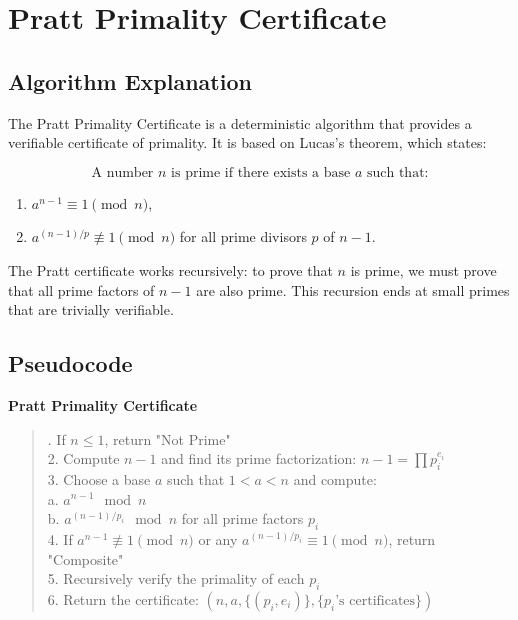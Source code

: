 \documentclass[12pt]{article}
\begin{document}
\section{Pratt Primality Certificate}

\subsection*{Algorithm Explanation}

The Pratt Primality Certificate is a deterministic algorithm that provides a verifiable certificate of primality. It is based on Lucas's theorem, which states:

\[
\text{A number } n \text{ is prime if there exists a base } a \text{ such that:}
\]
\begin{enumerate}
    \item \( a^{n-1} \equiv 1 \pmod{n} \),
    \item \( a^{(n-1)/p} \not\equiv 1 \pmod{n} \) for all prime divisors \( p \) of \( n-1 \).
\end{enumerate}

The Pratt certificate works recursively: to prove that \( n \) is prime, we must prove that all prime factors of \( n-1 \) are also prime. This recursion ends at small primes that are trivially verifiable.

\subsection*{Pseudocode}

\textbf{Pratt Primality Certificate}


\begin{quote}. If \( n \leq 1 \), return "Not Prime" \\
2. Compute \( n-1 \) and find its prime factorization: \( n-1 = \prod p_i^{e_i} \) \\
3. Choose a base \( a \) such that \( 1 < a < n \) and compute: \\
\hspace*{2em} a. \( a^{n-1} \mod n \) \\
\hspace*{2em} b. \( a^{(n-1)/p_i} \mod n \) for all prime factors \( p_i \) \\
4. If \( a^{n-1} \not\equiv 1 \pmod{n} \) or any \( a^{(n-1)/p_i} \equiv 1 \pmod{n} \), return "Composite" \\
5. Recursively verify the primality of each \( p_i \) \\
6. Return the certificate: \( (n, a, \{(p_i, e_i)\}, \{p_i \text{'s certificates}\}) \)
\end{quote}
\end{document}
